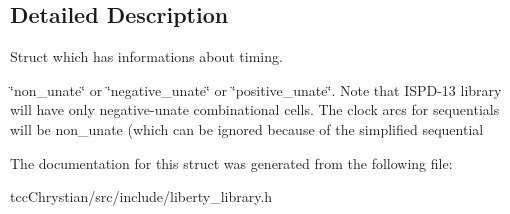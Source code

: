 \subsection{Detailed Description}
Struct which has informations about timing. 

\char`\"{}non\-\_\-unate\char`\"{} or \char`\"{}negative\-\_\-unate\char`\"{} or \char`\"{}positive\-\_\-unate\char`\"{}. Note that I\-S\-P\-D-\/13 library will have only negative-\/unate combinational cells. The clock arcs for sequentials will be non\-\_\-unate (which can be ignored because of the simplified sequential 

The documentation for this struct was generated from the following file\-:\begin{DoxyCompactItemize}
\item 
tcc\-Chrystian/src/include/liberty\-\_\-library.\-h\end{DoxyCompactItemize}
